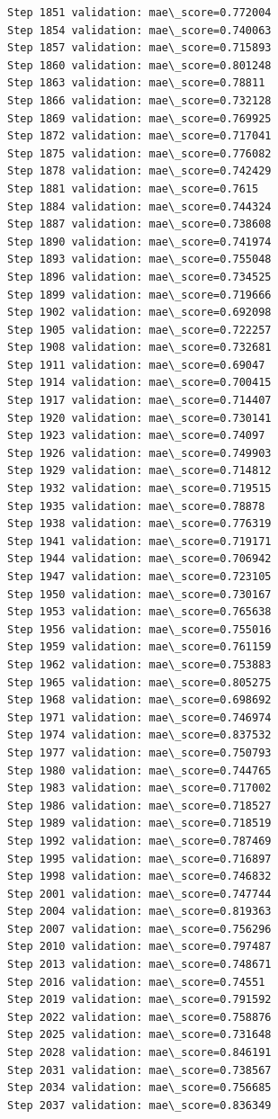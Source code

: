 \documentclass[11pt]{article}
\begin{document}
\begin{Verbatim}[commandchars=\\\{\}]
Step 1851 validation: mae\_score=0.772004
Step 1854 validation: mae\_score=0.740063
Step 1857 validation: mae\_score=0.715893
Step 1860 validation: mae\_score=0.801248
Step 1863 validation: mae\_score=0.78811
Step 1866 validation: mae\_score=0.732128
Step 1869 validation: mae\_score=0.769925
Step 1872 validation: mae\_score=0.717041
Step 1875 validation: mae\_score=0.776082
Step 1878 validation: mae\_score=0.742429
Step 1881 validation: mae\_score=0.7615
Step 1884 validation: mae\_score=0.744324
Step 1887 validation: mae\_score=0.738608
Step 1890 validation: mae\_score=0.741974
Step 1893 validation: mae\_score=0.755048
Step 1896 validation: mae\_score=0.734525
Step 1899 validation: mae\_score=0.719666
Step 1902 validation: mae\_score=0.692098
Step 1905 validation: mae\_score=0.722257
Step 1908 validation: mae\_score=0.732681
Step 1911 validation: mae\_score=0.69047
Step 1914 validation: mae\_score=0.700415
Step 1917 validation: mae\_score=0.714407
Step 1920 validation: mae\_score=0.730141
Step 1923 validation: mae\_score=0.74097
Step 1926 validation: mae\_score=0.749903
Step 1929 validation: mae\_score=0.714812
Step 1932 validation: mae\_score=0.719515
Step 1935 validation: mae\_score=0.78878
Step 1938 validation: mae\_score=0.776319
Step 1941 validation: mae\_score=0.719171
Step 1944 validation: mae\_score=0.706942
Step 1947 validation: mae\_score=0.723105
Step 1950 validation: mae\_score=0.730167
Step 1953 validation: mae\_score=0.765638
Step 1956 validation: mae\_score=0.755016
Step 1959 validation: mae\_score=0.761159
Step 1962 validation: mae\_score=0.753883
Step 1965 validation: mae\_score=0.805275
Step 1968 validation: mae\_score=0.698692
Step 1971 validation: mae\_score=0.746974
Step 1974 validation: mae\_score=0.837532
Step 1977 validation: mae\_score=0.750793
Step 1980 validation: mae\_score=0.744765
Step 1983 validation: mae\_score=0.717002
Step 1986 validation: mae\_score=0.718527
Step 1989 validation: mae\_score=0.718519
Step 1992 validation: mae\_score=0.787469
Step 1995 validation: mae\_score=0.716897
Step 1998 validation: mae\_score=0.746832
Step 2001 validation: mae\_score=0.747744
Step 2004 validation: mae\_score=0.819363
Step 2007 validation: mae\_score=0.756296
Step 2010 validation: mae\_score=0.797487
Step 2013 validation: mae\_score=0.748671
Step 2016 validation: mae\_score=0.74551
Step 2019 validation: mae\_score=0.791592
Step 2022 validation: mae\_score=0.758876
Step 2025 validation: mae\_score=0.731648
Step 2028 validation: mae\_score=0.846191
Step 2031 validation: mae\_score=0.738567
Step 2034 validation: mae\_score=0.756685
Step 2037 validation: mae\_score=0.836349

\end{Verbatim}
\end{document}
